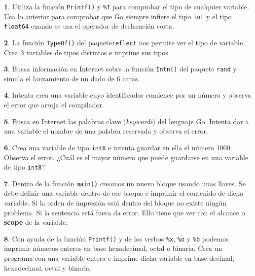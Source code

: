 \documentclass[a4paper, 12pt]{article}
\theoremstyle{definition}
\newtheorem{ejer}{}[section]
\begin{document}
\begin{ejer}
Utiliza la función \verb|Printf()| y \verb|%T| para comprobar el tipo de cualquier variable. Usa lo anterior para comprobar que Go siempre infiere el tipo \verb|int| y el tipo \verb|float64| cuando se usa el operador de declaración corta.
\end{ejer}

\begin{ejer}
La función \verb|TypeOf()| del paquete\verb|reflect| nos permite ver el tipo de variable. Crea 3 variables de tipos distintos e imprime sus tipos.
\end{ejer}

\begin{ejer}
Busca información en Internet sobre la función \verb|Intn()| del paquete \verb|rand| y simula el lanzamiento de un dado de 6 caras.
\end{ejer}

\begin{ejer}
Intenta crea una variable cuyo identificador comience por un número y observa el error que arroja el compilador.
\end{ejer}

\begin{ejer}
Busca en Internet las palabras clave (\textit{keywords}) del lenguaje Go. Intenta dar a una variable el nombre de una palabra reservada y observa el error.
\end{ejer}

\begin{ejer}
Crea una variable de tipo \verb|int8| e intenta guardar en ella el número 1000. Observa el error. ¿Cuál es el mayor número que puede guardarse en una variable de tipo \verb|int8|?
\end{ejer}

\begin{ejer}
Dentro de la función \verb|main()| creamos un nuevo bloque usando unas llaves. Se debe definir una variable dentro de ese bloque e imprimir el contenido de dicha variable. Si la orden de impresión está dentro del bloque no existe ningún problema. Si la sentencia está fuera da error. Ello tiene que ver con el alcance o \textbf{scope} de la variable.
\end{ejer}

\begin{ejer}
Con ayuda de la función \verb|Printf()| y de los verbos \verb|%x|, \verb|%o| y \verb|%b| podemos imprimir números enteros en base hexadecimal, octal o binaria. Crea un programa con una variable entera e imprime dicha variable en base decimal, hexadecimal, octal y binaria.
\end{ejer}
\end{document}
